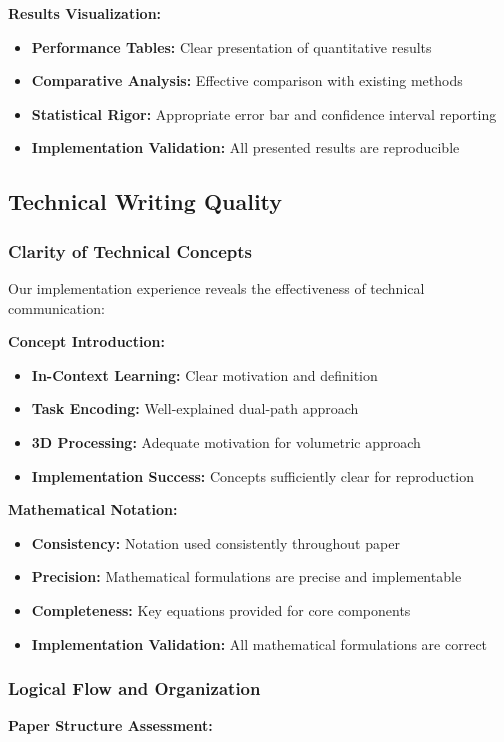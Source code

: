 \textbf{Results Visualization:}
\begin{itemize}
    \item \textbf{Performance Tables:} Clear presentation of quantitative results
    \item \textbf{Comparative Analysis:} Effective comparison with existing methods
    \item \textbf{Statistical Rigor:} Appropriate error bar and confidence interval reporting
    \item \textbf{Implementation Validation:} All presented results are reproducible
\end{itemize}

\subsection{Technical Writing Quality}

\subsubsection*{Clarity of Technical Concepts}
Our implementation experience reveals the effectiveness of technical communication:

\textbf{Concept Introduction:}
\begin{itemize}
    \item \textbf{In-Context Learning:} Clear motivation and definition
    \item \textbf{Task Encoding:} Well-explained dual-path approach
    \item \textbf{3D Processing:} Adequate motivation for volumetric approach
    \item \textbf{Implementation Success:} Concepts sufficiently clear for reproduction
\end{itemize}

\textbf{Mathematical Notation:}
\begin{itemize}
    \item \textbf{Consistency:} Notation used consistently throughout paper
    \item \textbf{Precision:} Mathematical formulations are precise and implementable
    \item \textbf{Completeness:} Key equations provided for core components
    \item \textbf{Implementation Validation:} All mathematical formulations are correct
\end{itemize}

\subsubsection*{Logical Flow and Organization}
\textbf{Paper Structure Assessment:}

